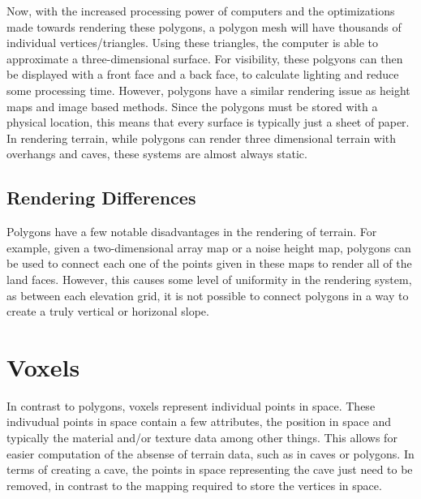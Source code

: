 \documentclass[10pt]{report}
\begin{document}
		Now, with the increased processing power of computers and the optimizations made towards rendering these polygons, a polygon mesh will have thousands of individual vertices/triangles. Using these triangles, the computer is able to approximate a three-dimensional surface. For visibility, these polgyons can then be displayed with a front face and a back face, to calculate lighting and reduce some processing time. However, polygons have a similar rendering issue as height maps and image based methods. Since the polygons must be stored with a physical location, this means that every surface is typically just a sheet of paper. In rendering terrain, while polygons can render three dimensional terrain with overhangs and caves, these systems are almost always static. 
	
		\section{Rendering Differences}
		Polygons have a few notable disadvantages in the rendering of terrain. For example, given a two-dimensional array map or a noise height map, polygons can be used to connect each one of the points given in these maps to render all of the land faces. However, this causes some level of uniformity in the rendering system, as between each elevation grid, it is not possible to connect polygons in a way to create a truly vertical or horizonal slope. 
		
	
	\vspace{10pt}
	\let\clearpage\relax
	\chapter{Voxels}
	
		In contrast to polygons, voxels represent individual points in space. These indivudual points in space contain a few attributes, the position in space and typically the material and/or texture data among other things. This allows for easier computation of the absense of terrain data, such as in caves or polygons. In terms of creating a cave, the points in space representing the cave just need to be removed, in contrast to the mapping required to store the vertices in space. 
		
\end{document}
